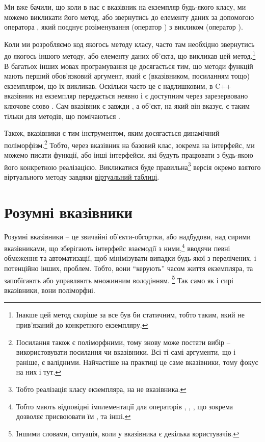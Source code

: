 \documentclass[12pt]{article}
\begin{document}
    Ми вже бачили, що коли в нас є вказівник на екземпляр будь-якого класу, ми можемо викликати його метод, або звернутись до елементу даних за допомогою оператора \m{->}, який поєднує розіменування (оператор \m{*}) з викликом (оператор ).

    Коли ми розробляємо код якогось методу класу, часто там необхідно звернутись до якогось іншого методу, або елементу даних об'єкта, що викликав цей метод.\footnote{Інакше цей метод скоріше за все був би статичним, тобто таким, який не прив'язаний до конкретного екземпляру.} В багатьох інших мовах програмування це досягається тим, що методи функцій мають перший обов'язковий аргумент, який є (вказівником, посиланням тощо) екземпляром, що їх викликав. Оскільки часто це є надлишковим, в C++ вказівник на екземпляр передається неявно і є доступним через зарезервовано ключове слово . Сам вказівник є завжди , а об'єкт, на який він вказує, є таким тільки для методів, що помічаються . 
    
    Також, вказівники є тим інструментом, яким досягається динамічний поліморфізм.\footnote{Посилання також є поліморфними, тому знову може постати вибір -- використовувати посилання чи вказівники. Всі ті самі аргументи, що і раніше, є валідними. Найчастіше на практиці це саме вказівники, тому фокус на них і тут.} Тобто, через вказівник на базовий клас, зокрема на інтерфейс, ми можемо писати функції, або інші інтерфейси, які будуть працювати з будь-якою його конкретною реалізацією. Викликатися буде правильна\footnote{Тобто реалізація класу екземпляра, на не вказівника.} версія окремо взятого віртуального методу завдяки \href{https://en.cppreference.com/w/cpp/language/virtual}{віртуальний таблиці}.

    \section{Розумні вказівники}
    Розумні вказівники -- це звичайні об'єкти-обгортки, або надбудови, над сирими вказівниками, що зберігають інтерфейс взаємодії з ними,\footnote{Тобто мають відповідні імплементації для операторів \m{*}, \m{->}, \m{=}, що зокрема дозволяє присвоювати їм , та інші.} вводячи певні обмеження та автоматизації, щоб мінімізувати випадки будь-якої з перелічених, і потенційно інших, проблем. Тобто, вони ``керують'' часом життя екземпляра, та запобігають або управляють множинним володінням. \footnote{Іншими словами, ситуація, коли у вказівника є декілька користувачів.} Так само як і сирі вказівники, вони поліморфні.
\end{document}
